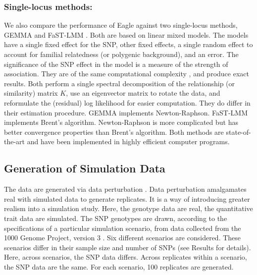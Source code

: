 \documentclass{bioinfo}
\begin{document}
\subsubsection{Single-locus methods:} We also compare the performance of Eagle against two single-locus methods, GEMMA \citep{zhou2012genome} and FaST-LMM \citep{lippert2011fast}. Both are based on linear mixed models. The models have a single fixed effect for the SNP,  other fixed effects, 
a single random effect to account for familial relatedness (or polygenic background), and an error. The significance of the SNP effect in the model 
is a measure of the strength of association.  They are of the same computational complexity \citep{zhou2012genome}, and produce exact results.  
Both perform a single spectral decomposition of the relationship (or similarity) matrix $K$, use  an eigenvector matrix to rotate the data, 
and reformulate the (residual) log likelihood for easier computation. They do differ in their estimation procedure. GEMMA implements Newton-Raphson. 
FaST-LMM implements Brent's algorithm. Newton-Raphson is more complicated but has better convergence properties than Brent's algorithm. 
Both methods are state-of-the-art and have been implemented in highly efficient computer programs. 



\subsection{Generation of Simulation Data}
\label{subsection:simdata}

The data are generated via data perturbation \citep{zhao2007arabidopsis}. 
Data perturbation amalgamates real with simulated data to generate replicates. 
It is a way of introducing greater realism into a simulation study. 
 Here, the genotype data are real, the 
quantitative trait data are simulated. 
 The SNP genotypes are drawn, 
according to the specifications of a particular simulation scenario, from data collected from the 1000 Genome Project, version 3   \citep{10002010map}. Six different scenarios are considered. These scenarios differ in  their sample size and number of 
SNPs (see Results for details).  Here, across scenarios, the SNP data differs. Across replicates within a scenario, the SNP data are the same. For each scenario, 100 replicates are generated. 
\end{document}
